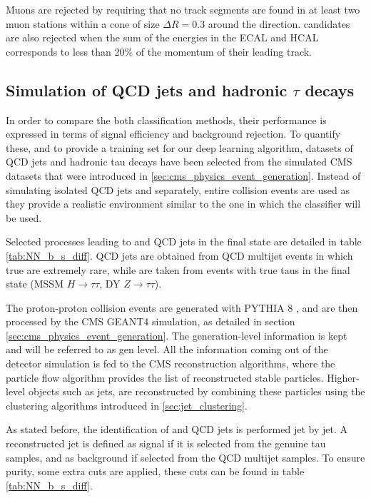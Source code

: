 Muons are rejected by requiring that no track segments are found in at least two muon stations within a cone of size $\Delta R = 0.3$ around the \tauh direction. \tauh candidates are also rejected when the sum of the energies in the ECAL and HCAL corresponds to less than 20\% of the momentum of their leading track.

\subsection{Simulation of QCD jets and hadronic $\tau$ decays}
\label{sec:NN_datasets}

In order to compare the both classification methods, their performance is expressed in terms of signal efficiency and background rejection. To quantify these, and to provide a training set for our deep learning algorithm, datasets of QCD jets and hadronic tau decays have been selected from the simulated CMS datasets that were introduced in \ref{sec:cms_physics_event_generation}. Instead of simulating isolated QCD jets and \tauh separately, entire collision events are used as they provide a realistic environment similar to the one in which the classifier will be used.

Selected processes leading to \tauh and QCD jets in the final state are detailed in table \ref{tab:NN_b_s_diff}. QCD jets are obtained from QCD multijet events in which true \tauh are extremely rare, while \tauh are taken from events with true taus in the final state (MSSM $H\rightarrow \tau\tau$, DY $Z\rightarrow \tau\tau$).


The proton-proton collision events are generated with PYTHIA 8 \cite{SJOSTRAND2008852}, and are then processed by the CMS GEANT4 simulation, as detailed in section \ref{sec:cms_physics_event_generation}. The generation-level information is kept and will be referred to as gen level. All the information coming out of the detector simulation is fed to the CMS reconstruction algorithms, where the particle flow algorithm provides the list of reconstructed stable particles. Higher-level objects such as jets, are reconstructed by combining these particles using the clustering algorithms introduced in \ref{sec:jet_clustering}.

As stated before, the identification of \tauh and QCD jets is performed jet by jet. A reconstructed jet is defined as signal if it is selected from the genuine tau samples, and as background if selected from the QCD multijet samples. To ensure purity, some extra cuts are applied, these cuts can be found in table \ref{tab:NN_b_s_diff}.

